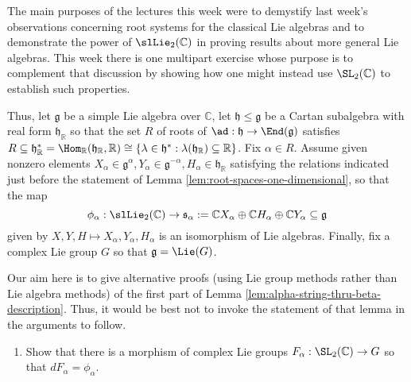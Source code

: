 \documentclass[reqno]{amsart} 
\begin{document}
\begin{homework}\label{hw:Falphaz}
 The main purposes of the lectures
  this week were to demystify last week's observations
  concerning root systems for the classical Lie algebras and to
  demonstrate the power of $\slLie_2(\mathbb{C})$
  in proving results about more general Lie algebras.
  This week there is one multipart exercise whose purpose is to complement that
  discussion
  by showing how one might instead use $\SL_2(\mathbb{C})$
  to establish such properties.

  Thus, let $\mathfrak{g}$ be a simple Lie algebra over
  $\mathbb{C}$,
  let $\mathfrak{h} \leq \mathfrak{g}$ be a Cartan subalgebra
  with real form  $\mathfrak{h}_\mathbb{R}$
  so that the set $R$ of roots of $\ad  : \mathfrak{h}
  \rightarrow \End(\mathfrak{g})$
  satisfies $R \subseteq \mathfrak{h}_\mathbb{R}^*  =
  \Hom_\mathbb{R}(\mathfrak{h}_\mathbb{R},\mathbb{R})
  \cong \{\lambda \in \mathfrak{h}^* : \lambda(\mathfrak{h}_\mathbb{R}) \subseteq \mathbb{R} \}$.
  Fix $\alpha \in R$.
  Assume given nonzero elements $X_\alpha \in
  \mathfrak{g}^\alpha,
  Y_\alpha \in \mathfrak{g}^{-\alpha}, H_\alpha \in
  \mathfrak{h}_\mathbb{R}$
  satisfying the relations indicated just before
  the statement of Lemma \ref{lem:root-spaces-one-dimensional},
  so that the map 
\begin{equation*}
\phi_\alpha : \slLie_2(\mathbb{C})
  \rightarrow \mathfrak{s}_\alpha  := \mathbb{C} X_\alpha
  \oplus \mathbb{C} H_\alpha \oplus \mathbb{C} Y_\alpha
  \subseteq \mathfrak{g}
\end{equation*}
  given by $X,Y,H \mapsto X_\alpha,Y_\alpha,H_\alpha$
  is an isomorphism of Lie algebras.
  Finally, fix a complex Lie group $G$
  so that $\mathfrak{g} = \Lie(G)$.

  Our aim here is to give alternative
  proofs
  (using Lie group methods rather than Lie algebra methods)
  of the first part of Lemma
  \ref{lem:alpha-string-thru-beta-description}.
  Thus, it would be best not to invoke the statement of that lemma in the arguments to follow.
  \begin{enumerate}
  \item
    Show that there is a morphism of complex Lie groups
    $F_\alpha : \SL_2(\mathbb{C}) \rightarrow G$
    so that $d F_\alpha = \phi_\alpha$.


\end{enumerate}
\end{homework}
\end{document}
